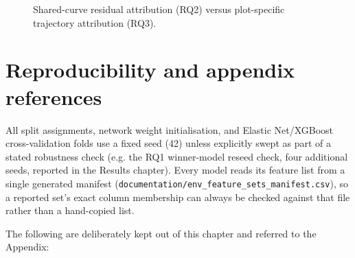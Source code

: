 \documentclass[11pt,a4paper]{report}
\begin{document}
\begin{figure}[!htbp]
\centering
{}
\caption{Shared-curve residual attribution (RQ2) versus plot-specific trajectory attribution
(RQ3).}
\label{fig:attribution-comparison}
\end{figure}

\section{Reproducibility and appendix references}
\label{sec:reproducibility}

All split assignments, network weight initialisation, and Elastic Net/XGBoost cross-validation
folds use a fixed seed (42) unless explicitly swept as part of a stated robustness check (e.g. the
RQ1 winner-model reseed check, four additional seeds, reported in the Results chapter). Every
model reads its feature list from a single generated manifest
(\texttt{documentation/env\_feature\_sets\_manifest.csv}), so a reported set's exact column
membership can always be checked against that file rather than a hand-copied list.

The following are deliberately kept out of this chapter and referred to the Appendix:
\end{document}

